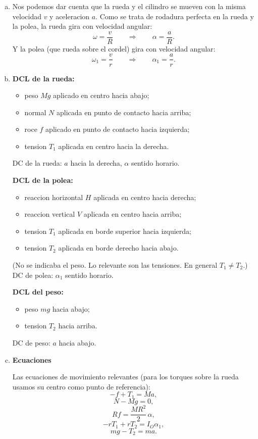 \begin{enumerate}[a)]
\item Nos podemos dar cuenta que la rueda y el cilindro se mueven con la misma velocidad $v$ y aceleracion $a$. Como se trata de rodadura perfecta en la rueda y la polea, la rueda gira con velocidad angular:
\[
\omega=\frac{v}{R}
\qquad\Rightarrow\qquad
\alpha=\frac{a}{R}.
\]
Y la polea (que rueda sobre el cordel) gira con velocidad angular:
\[
\omega_1=\frac{v}{r}
\qquad\Rightarrow\qquad
\alpha_1=\frac{a}{r}.
\]


\item \textbf{DCL de la rueda:} 
\begin{itemize}
\item peso $Mg$ aplicado en centro hacia abajo;
\item normal $N$ aplicada en punto de contacto hacia arriba;
\item roce $f$ aplicado en punto de contacto hacia izquierda;
\item tension $T_1$ aplicada en centro hacia la derecha.
\end{itemize}
DC de la rueda: $a$ hacia la derecha, $\alpha$ sentido horario.

\textbf{DCL de la polea:}
\begin{itemize}
\item reaccion horizontal $H$ aplicada en centro hacia derecha;
\item reaccion vertical $V$ aplicada en centro hacia arriba;
\item tension $T_1$ aplicada en borde superior hacia izquierda;
\item tension $T_2$ aplicada en borde derecho hacia abajo.
\end{itemize}
(No se indicaba el peso. Lo relevante son las tensiones. En general $T_1\neq T_2$.)
DC de polea: $\alpha_1$ sentido horario.

\textbf{DCL del peso:}
\begin{itemize}
\item peso $mg$ hacia abajo;
\item tension $T_2$ hacia arriba.
\end{itemize}
DC de peso: $a$ hacia abajo.


\item \textbf{Ecuaciones}

Las ecuaciones de movimiento relevantes (para los torques sobre la rueda usamos su centro como punto de referencia):
\[
-f+T_1=Ma,
\]
\[
N-Mg=0,
\]
\[
Rf=\frac{MR^2}{2}\,\alpha,
\]
\[
-rT_1+rT_2=I_O\alpha_1,
\]
\[
mg-T_2=ma.
\]


\end{enumerate}
